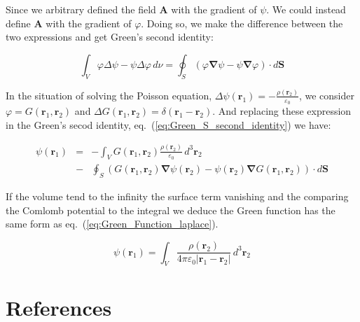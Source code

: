 \documentclass[final, paper=letter,5p,times,twocolumn]{elsarticle}
\theoremstyle{definition}
\begin{document}
Since we arbitrary defined the field $\bm{A}$ with the gradient of $\psi$. We could instead define $\bm{A}$ with the gradient of $\varphi$. Doing so, we make the difference between the two expressions and get Green's second identity:

\begin{equation}
  \int_{V} \varphi \Delta \psi - \psi \Delta \varphi \, d\nu = \oint_{S} \left( \varphi \bm{\nabla} \psi  - \psi \bm{\nabla} \varphi \right) \cdot d\bm{S}
  \label{eq:Green_S_second_identity}
\end{equation}

In the situation of solving the Poisson equation, $\Delta \psi(\bm{r}_{1}) = - \frac{\rho(\bm{r}_{2})}{\varepsilon_{0}}$, we consider $\varphi = G(\bm{r}_{1}, \bm{r}_{2})$ and $\Delta G(\bm{r}_{1}, \bm{r}_{2}) = \delta(\bm{r}_{1} - \bm{r}_{2})$. And replacing these expression in the Green's secod identity, eq.~(\ref{eq:Green_S_second_identity}) we have:

\begin{equation}
  \begin{array}{rcl}
    \psi(\bm{r}_{1}) & = & - \int_{V} G(\bm{r}_{1}, \bm{r}_{2}) \frac{\rho(\bm{r}_{2})}{\varepsilon_{0}} \, d^{3}\bm{r}_{2} \\
    & - & \oint_{S} \left(  G(\bm{r}_{1}, \bm{r}_{2})  \bm{\nabla} \psi(\bm{r}_{2})  - \psi(\bm{r}_{2}) \bm{\nabla} G(\bm{r}_{1}, \bm{r}_{2}) \right) \cdot d\bm{S}
  \end{array}
\end{equation}

If the volume tend to the infinity the surface term vanishing and the comparing the Comlomb potential to the integral we deduce the Green function has the same form as eq.~(\ref{eq:Green_Function_laplace}).

\begin{equation}
  \psi(\bm{r}_{1}) = \int_{V} \frac{\rho(\bm{r}_{2})}{4\pi\varepsilon_{0} |\bm{r}_{1} - \bm{r}_{2}|} \, d^{3}\bm{r}_{2}
  \label{eq:Coulomb_potential}
\end{equation}

\section*{References}



\end{document}
